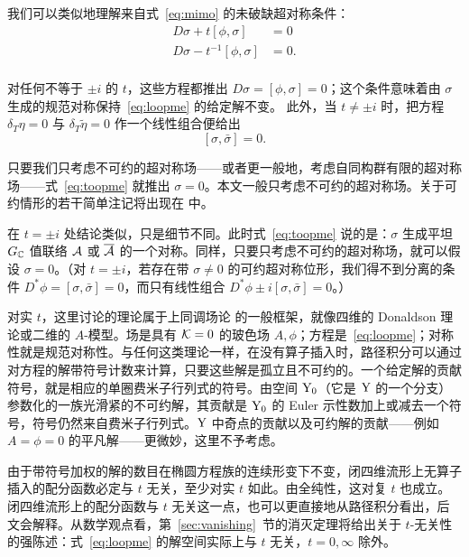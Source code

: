 我们可以类似地理解来自式~\eqref{eq:mimo} 的未破缺超对称条件：
\setcounter{equation}{29}
\begin{equation}\label{eq:toopme}
\begin{aligned}D\sigma + t[\phi,\sigma]& = 0\\
                     D\sigma - t^{-1}[\phi,\sigma]& = 0.\\
                     \end{aligned}
\end{equation}

对任何不等于 $\pm i$ 的 $t$，这些方程都推出 $D\sigma=[\phi,\sigma]=0$；这个条件意味着由 $\sigma$ 生成的规范对称保持~\eqref{eq:loopme} 的给定解不变。
此外，当 $t\not=\pm i$ 时，把方程 $\delta_T\eta=0$ 与 $\delta_T\tilde\eta=0$ 作一个线性组合便给出
\setcounter{equation}{30}
\begin{equation}\label{eq:woopem}
[\sigma,\bar\sigma]=0.
\end{equation}

只要我们只考虑不可约的超对称场——或者更一般地，考虑自同构群有限的超对称场——式~\eqref{eq:toopme} 就推出 $\sigma=0$。本文一般只考虑不可约的超对称场。关于可约情形的若干简单注记将出现在 \cite{ref26} 中。

在 $t=\pm i$ 处结论类似，只是细节不同。此时式~\eqref{eq:toopme} 说的是：$\sigma$ 生成平坦 $G_\Bbb{C}$ 值联络 $\CA$ 或 $\bar\CA$ 的一个对称。同样，只要只考虑不可约的超对称场，就可以假设 $\sigma=0$。（对 $t=\pm i$，若存在带 $\sigma\not=0$ 的可约超对称位形，我们得不到分离的条件 $D^*\phi=[\sigma,\bar\sigma]=0$，而只有线性组合 $D^*\phi\pm i[\sigma,\bar\sigma]=0$。）

对实 $t$，这里讨论的理论属于上同调场论 \cite{ref59} 的一般框架，就像四维的 Donaldson 理论或二维的 $A$-模型。场是具有 ${\EUK}=0$ 的玻色场 $A,\phi$；方程是~\eqref{eq:loopme}；对称性就是规范对称性。与任何这类理论一样，在没有算子插入时，路径积分可以通过对方程的解带符号计数来计算，只要这些解是孤立且不可约的。一个给定解的贡献符号，就是相应的单圈费米子行列式的符号。由空间 ${\eurm Y}_0$（它是 ${\eurm Y}$ 的一个分支）参数化的一族光滑紧的不可约解，其贡献是 ${\eurm Y}_0$ 的 Euler 示性数加上或减去一个符号，符号仍然来自费米子行列式。${\eurm Y}$ 中奇点的贡献以及可约解的贡献——例如 $A=\phi=0$ 的平凡解——更微妙，这里不予考虑。

由于带符号加权的解的数目在椭圆方程族的连续形变下不变，闭四维流形上无算子插入的配分函数必定与 $t$ 无关，至少对实 $t$ 如此。由全纯性，这对复 $t$ 也成立。闭四维流形上的配分函数与 $t$ 无关这一点，也可以更直接地从路径积分看出，后文会解释。从数学观点看，第~\ref{sec:vanishing}~节的消灭定理将给出关于 $t$-无关性的强陈述：式~\eqref{eq:loopme} 的解空间实际上与 $t$ 无关，$t=0,\infty$ 除外。

